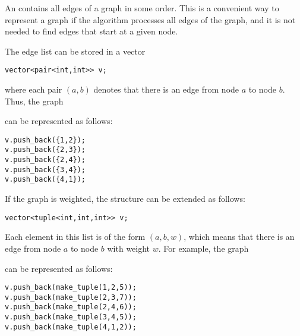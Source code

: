 An  contains all edges of a graph
in some order.
This is a convenient way to represent a graph
if the algorithm processes all edges of the graph,
and it is not needed to find edges that start
at a given node.

The edge list can be stored in a vector
\begin{lstlisting}
vector<pair<int,int>> v;
\end{lstlisting}
where each pair $(a,b)$ denotes that
there is an edge from node $a$ to node $b$.
Thus, the graph

\begin{center}
\end{center}
can be represented as follows:
\begin{lstlisting}
v.push_back({1,2});
v.push_back({2,3});
v.push_back({2,4});
v.push_back({3,4});
v.push_back({4,1});
\end{lstlisting}

\noindent
If the graph is weighted, the structure can
be extended as follows:
\begin{lstlisting}
vector<tuple<int,int,int>> v;
\end{lstlisting}
Each element in this list is of the
form $(a,b,w)$, which means that there
is an edge from node $a$ to node $b$ with weight $w$.
For example, the graph

\begin{center}
\end{center}
\begin{samepage}
can be represented as follows:
\begin{lstlisting}
v.push_back(make_tuple(1,2,5));
v.push_back(make_tuple(2,3,7));
v.push_back(make_tuple(2,4,6));
v.push_back(make_tuple(3,4,5));
v.push_back(make_tuple(4,1,2));
\end{lstlisting}
\end{samepage}